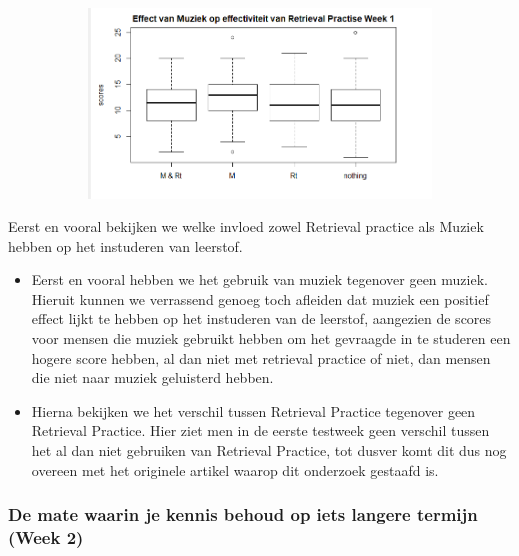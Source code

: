 \documentclass{hogent-article}
\begin{document}
\begin{figure}[H]
	\begin{subfigure}{0.50\textwidth}
		\includegraphics[width=\linewidth]{muziekGraph1}
	\end{subfigure}
\end{figure}

Eerst en vooral bekijken we welke invloed zowel Retrieval practice als Muziek hebben op het instuderen van leerstof.
\\
\begin{itemize}
    \item Eerst en vooral hebben we het gebruik van muziek tegenover geen muziek.
    Hieruit kunnen we verrassend genoeg toch afleiden dat muziek een positief effect lijkt te hebben op het instuderen van de leerstof, aangezien de scores voor mensen die muziek gebruikt hebben om het gevraagde in te studeren een hogere score hebben, al dan niet met retrieval practice of niet, dan mensen die niet naar muziek geluisterd hebben.
    \\
    \item Hierna bekijken we het verschil tussen Retrieval Practice tegenover geen Retrieval Practice.
    Hier ziet men in de eerste testweek geen verschil tussen het al dan niet gebruiken van Retrieval Practice, tot dusver komt dit dus nog overeen met het originele artikel \textcite{Roediger2006} waarop dit onderzoek gestaafd is.
    
\end{itemize}

\subsubsection{De mate waarin je kennis behoud op iets langere termijn (Week 2)}
\end{document}
